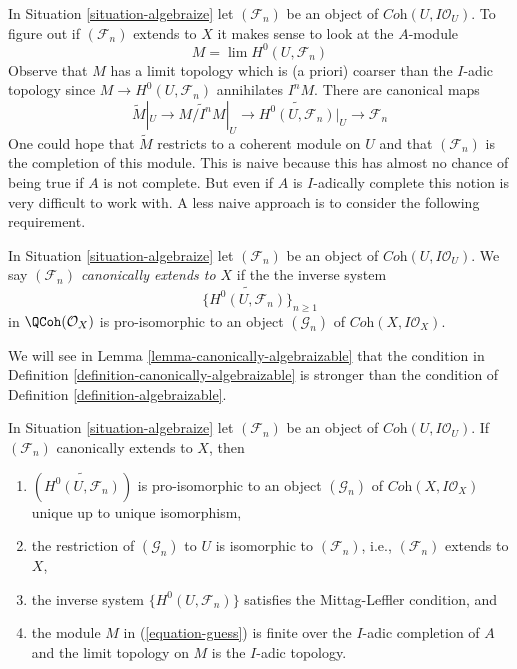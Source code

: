 \noindent
In Situation \ref{situation-algebraize} let $(\mathcal{F}_n)$ be an
object of $\textit{Coh}(U, I\mathcal{O}_U)$. To figure out if
$(\mathcal{F}_n)$ extends to $X$ it makes sense to look at the $A$-module
\begin{equation}
\label{equation-guess}
M = \lim H^0(U, \mathcal{F}_n)
\end{equation}
Observe that $M$ has a limit topology which is (a priori) coarser than
the $I$-adic topology since $M \to H^0(U, \mathcal{F}_n)$ annihilates $I^nM$.
There are canonical maps
$$
\widetilde{M}|_U \to \widetilde{M/I^nM}|_U \to
\widetilde{H^0(U, \mathcal{F}_n)}|_U \to
\mathcal{F}_n
$$
One could hope that $\widetilde{M}$ restricts to a coherent module
on $U$ and that $(\mathcal{F}_n)$ is the completion of this module.
This is naive because this has almost no chance of being true
if $A$ is not complete. But even if $A$ is $I$-adically complete
this notion is very difficult to work with.
A less naive approach is to consider the following requirement.

\begin{definition}
\label{definition-canonically-algebraizable}
In Situation \ref{situation-algebraize} let $(\mathcal{F}_n)$ be an
object of $\textit{Coh}(U, I\mathcal{O}_U)$. We say
{\it $(\mathcal{F}_n)$ canonically extends to $X$} if the the
inverse system
$$
\{\widetilde{H^0(U, \mathcal{F}_n)}\}_{n \geq 1}
$$
in $\QCoh(\mathcal{O}_X)$ is pro-isomorphic to an object
$(\mathcal{G}_n)$ of $\textit{Coh}(X, I\mathcal{O}_X)$.
\end{definition}

\noindent
We will see in Lemma \ref{lemma-canonically-algebraizable}
that the condition in Definition \ref{definition-canonically-algebraizable}
is stronger than the condition of Definition \ref{definition-algebraizable}.

\begin{lemma}
\label{lemma-canonically-algebraizable}
In Situation \ref{situation-algebraize} let $(\mathcal{F}_n)$ be an
object of $\textit{Coh}(U, I\mathcal{O}_U)$. If $(\mathcal{F}_n)$
canonically extends to $X$, then
\begin{enumerate}
\item $(\widetilde{H^0(U, \mathcal{F}_n)})$ is pro-isomorphic to an
object $(\mathcal{G}_n)$ of $\textit{Coh}(X, I \mathcal{O}_X)$
unique up to unique isomorphism,
\item the restriction of $(\mathcal{G}_n)$ to $U$ is isomorphic
to $(\mathcal{F}_n)$, i.e., $(\mathcal{F}_n)$ extends to $X$,
\item the inverse system $\{H^0(U, \mathcal{F}_n)\}$
satisfies the Mittag-Leffler condition, and
\item the module $M$ in (\ref{equation-guess}) is finite over the
$I$-adic completion of $A$ and the limit topology on
$M$ is the $I$-adic topology.
\end{enumerate}
\end{lemma}

